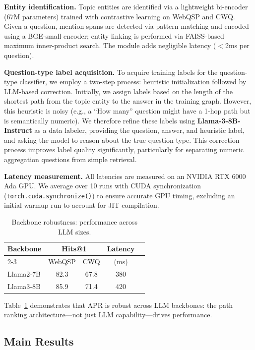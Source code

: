 \documentclass[conference]{IEEEtran}
\newcommand{\model}{\textsc{APR}}
\begin{document}
\textbf{Entity identification.} Topic entities are identified via a lightweight bi-encoder (67M parameters) trained with contrastive learning on WebQSP and CWQ. Given a question, mention spans are detected via pattern matching and encoded using a BGE-small encoder; entity linking is performed via FAISS-based maximum inner-product search. The module adds negligible latency ($<$2ms per question).

\textbf{Question-type label acquisition.} To acquire training labels for the question-type classifier, we employ a two-step process: heuristic initialization followed by LLM-based correction. Initially, we assign labels based on the length of the shortest path from the topic entity to the answer in the training graph. However, this heuristic is noisy (e.g., a “How many” question might have a 1-hop path but is semantically numeric). We therefore refine these labels using \textbf{Llama-3-8B-Instruct} \cite{meta2024llama3} as a data labeler, providing the question, answer, and heuristic label, and asking the model to reason about the true question type. This correction process improves label quality significantly, particularly for separating numeric aggregation questions from simple retrieval.

\textbf{Latency measurement.} All latencies are measured on an NVIDIA RTX 6000 Ada GPU. We average over 10 runs with CUDA synchronization (\texttt{torch.cuda.synchronize()}) to ensure accurate GPU timing, excluding an initial warmup run to account for JIT compilation.

\begin{table}[t]
\centering
\caption{Backbone robustness: performance across LLM sizes.}
\label{tab:backbone_comparison}
\begin{tabular}{lcccc}
\toprule
Backbone & \multicolumn{2}{c}{Hits@1} & Latency \\
\cmidrule(lr){2-3}
 & WebQSP & CWQ & (ms) \\
\midrule
Llama2-7B & 82.3 & 67.8 & 380 \\
Llama3-8B & 85.9 & 71.4 & 420 \\
\bottomrule
\end{tabular}
\end{table}

Table~\ref{tab:backbone_comparison} demonstrates that \model{} is robust across LLM backbones: the path ranking architecture---not just LLM capability---drives performance.

\subsection{Main Results}
\end{document}
